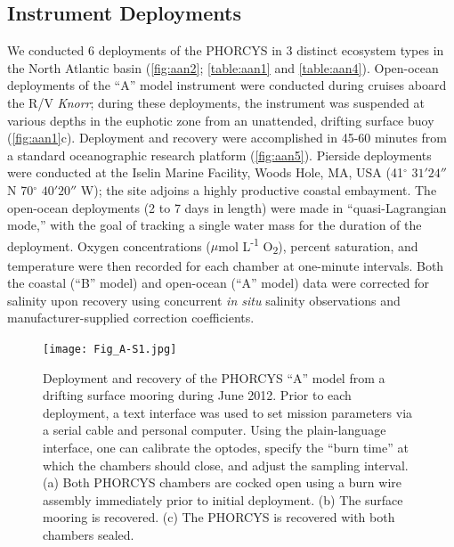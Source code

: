 \subsection{Instrument Deployments}
We conducted 6 deployments of the PHORCYS in 3 distinct ecosystem types in the North Atlantic basin (\autoref{fig:aan2}; \autoref{table:aan1} and \autoref{table:aan4}). Open-ocean deployments of the ``A'' model instrument were conducted during cruises aboard the R/V \emph{Knorr}; during these deployments, the instrument was suspended at various depths in the euphotic zone from an unattended, drifting surface buoy (\autoref{fig:aan1}c). Deployment and recovery were accomplished in 45-60 minutes from a standard oceanographic research platform (\autoref{fig:aan5}). Pierside deployments were conducted at the Iselin Marine Facility, Woods Hole, MA, USA (41$^{\circ}$ $31'24''$ N 70$^{\circ}$ $40'20''$ W); the site adjoins a highly productive coastal embayment. The open-ocean deployments (2 to 7 days in length) were made in ``quasi-Lagrangian mode,'' with the goal of tracking a single water mass for the duration of the deployment. Oxygen concentrations ($\mu$mol L\textsuperscript{-1} O\textsubscript{2}), percent saturation, and temperature were then recorded for each chamber at one-minute intervals. Both the coastal (``B'' model) and open-ocean (``A'' model) data were corrected for salinity upon recovery using concurrent \emph{in situ} salinity observations and manufacturer-supplied correction coefficients.
\begin{figure}
\centering
\texttt{[image: Fig\_A-S1.jpg]}
\caption[Deployment and recovery of the PHORCYS ``A'' model from a drifting surface mooring during June 2012]{Deployment and recovery of the PHORCYS ``A'' model from a drifting surface mooring during June 2012. Prior to each deployment, a text interface was used to set mission parameters via a serial cable and personal computer. Using the plain-language interface, one can calibrate the optodes, specify the ``burn time'' at which the chambers should close, and adjust the sampling interval. (a) Both PHORCYS chambers are cocked open using a burn wire assembly immediately prior to initial deployment. (b) The surface mooring is recovered. (c) The PHORCYS is recovered with both chambers sealed.}
\label{fig:aan5}
\end{figure}
